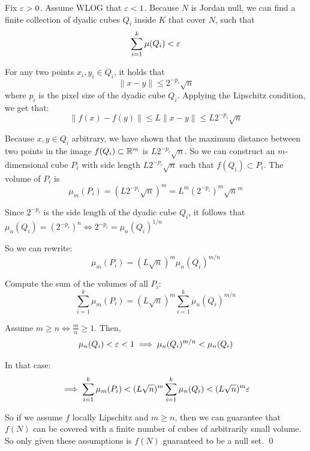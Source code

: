 \documentclass[12pt]{article}
\begin{document}
Fix $\varepsilon > 0$. Assume WLOG that $\varepsilon < 1$. Because $N$ is Jordan null, we can find a finite collection of dyadic cubes $Q_i$ inside $K$ that cover $N$, such that
$$
    \sum_{i = 1}^{k}\mu(Q_i) < \varepsilon
$$

For any two points $x_i, y_i \in Q_i$, it holds that
$$
    \lVert x-y \rVert \leq 2^{-p_i} \sqrt{n}
$$
where $p_i$ is the pixel size of the dyadic cube $Q_i$. Applying the Lipschitz condition, we get that:
$$
    \lVert f(x)- f(y) \rVert \leq L \lVert x - y \rVert \leq L 2^{-p_i} \sqrt{n}
$$

Because $x, y \in Q_i$ arbitrary, we have shown that the maximum distance between two points in the image $f(Q_i) \subset \mathbb{R}^m$ is $L 2^{-p_i} \sqrt{n}$. So we can construct an $m$-dimensional cube $P_i$ with side length $L 2^{-p_i} \sqrt{n}$ such that $f(Q_i) \subset P_i$. The volume of $P_i$ is
$$
    \mu_m(P_i) = (L 2^{-p_i} \sqrt{n})^m = L^m (2^{-p_i})^m \sqrt{n}^m
$$

Since $2^{-p_i}$ is the side length of the dyadic cube $Q_i$, it follows that $\mu_n(Q_i) = (2^{-p_i})^n \iff 2^{-p_i} = \mu_n(Q_i)^{1/n}$


So we can rewrite:
$$
    \mu_m(P_i) = (L \sqrt{n})^m \mu_n(Q_i)^{m/n}
$$

Compute the sum of the volumes of all $P_i$:
$$
    \sum_{i = 1}^{k} \mu_m(P_i) = (L \sqrt{n})^m \sum_{i = 1}^{k} \mu_n(Q_i)^{m/n}
$$


Assume $m \geq n \iff \frac{m}{n} \geq 1$. Then, 
$$
    \mu_n(Q_i) < \varepsilon < 1 \implies \mu_n(Q_i)^{m/n} < \mu_n(Q_i)
$$

In that case:
$$
    \implies \sum_{i = 1}^{k} \mu_m(P_i) < (L \sqrt{n})^m \sum_{i = 1}^{k} \mu_n(Q_i) < (L \sqrt{n})^m \varepsilon
$$

So if we assume $f$ locally Lipschitz and $m \geq n$, then we can guarantee that $f(N)$ can be covered with a finite number of cubes of arbitrarily small volume. So only given these assumptions is $f(N)$ guaranteed to be a null set. \qed
\end{document}
